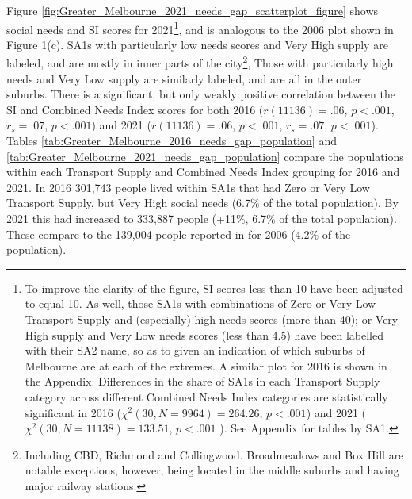 \documentclass[preprint, 3p,
authoryear]{elsarticle} %
\begin{document}
Figure \ref{fig:Greater_Melbourne_2021_needs_gap_scatterplot_figure}
shows social needs and SI scores for 2021\footnote{To improve the
  clarity of the figure, SI scores less than 10 have been adjusted to
  equal 10. As well, those SA1s with combinations of Zero or Very Low
  Transport Supply and (especially) high needs scores (more than 40); or
  Very High supply and Very Low needs scores (less than 4.5) have been
  labelled with their SA2 name, so as to given an indication of which
  suburbs of Melbourne are at each of the extremes. A similar plot for
  2016 is shown in the Appendix. Differences in the share of SA1s in
  each Transport Supply category across different Combined Needs Index
  categories are statistically significant in 2016
  (\(\chi^2(30, N = 9964) = 264.26\), \(p < .001\)) and 2021
  (\(\chi^2(30, N = 11138) = 133.51\), \(p < .001\) ). See Appendix for
  tables by SA1.}, and is analogous to the 2006 plot shown in Figure
1(c). SA1s with particularly low needs scores and Very High supply are
labeled, and are mostly in inner parts of the city\footnote{Including
  CBD, Richmond and Collingwood. Broadmeadows and Box Hill are notable
  exceptions, however, being located in the middle suburbs and having
  major railway stations.}, Those with particularly high needs and Very
Low supply are similarly labeled, and are all in the outer suburbs.
There is a significant, but only weakly positive correlation between the
SI and Combined Needs Index scores for both 2016 (\(r(11136) = .06\),
\(p < .001\), \(r_s =.07\), \(p < .001\)) and 2021 (\(r(11136) = .06\),
\(p < .001\), \(r_s =.07\), \(p < .001\)). Tables
\ref{tab:Greater_Melbourne_2016_needs_gap_population} and
\ref{tab:Greater_Melbourne_2021_needs_gap_population} compare the
populations within each Transport Supply and Combined Needs Index
grouping for 2016 and 2021. In 2016 301,743 people lived within SA1s
that had Zero or Very Low Transport Supply, but Very High social needs
(6.7\% of the total population). By 2021 this had increased to 333,887
people (+11\%, 6.7\% of the total population). These compare to the
139,004 people reported in \citet{currie2010identifying} for 2006 (4.2\%
of the population).
\end{document}
